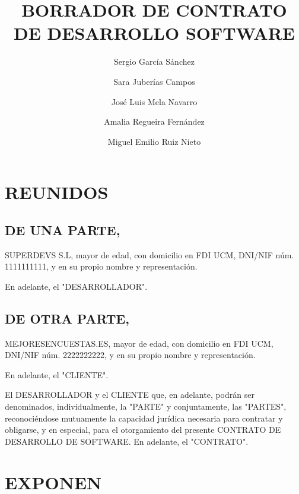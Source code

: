 \documentclass[a4paper,11pt]{report}
\begin{document}
	\title{BORRADOR DE CONTRATO DE DESARROLLO SOFTWARE}
	\author{
		Sergio García Sánchez
		\and
		Sara Juberías Campos
		\and
		José Luis Mela Navarro
		\and
		Amalia Regueira Fernández
		\and
		Miguel Emilio Ruiz Nieto
	}

	\maketitle

	\section*{REUNIDOS}

	\subsection*{DE UNA PARTE,}

	SUPERDEVS S.L, mayor de edad, con domicilio en FDI UCM, DNI/NIF núm.
	1111111111, y en su propio nombre y representación.

	En adelante, el "DESARROLLADOR".

	\subsection*{DE OTRA PARTE,}

	MEJORESENCUESTAS.ES, mayor de edad, con domicilio en FDI UCM, DNI/NIF núm.
	2222222222, y en su propio nombre y representación.

	En adelante, el "{CLIENTE}".

	El DESARROLLADOR y el CLIENTE que, en adelante, podrán ser denominados,
	individualmente, la "PARTE" y conjuntamente, las "PARTES",
	reconociéndose mutuamente la capacidad jurídica necesaria para contratar
	y obligarse, y en especial, para el otorgamiento del presente CONTRATO
	DE DESARROLLO DE SOFTWARE. En adelante, el "{CONTRATO}".

	\section*{EXPONEN}
\end{document}
